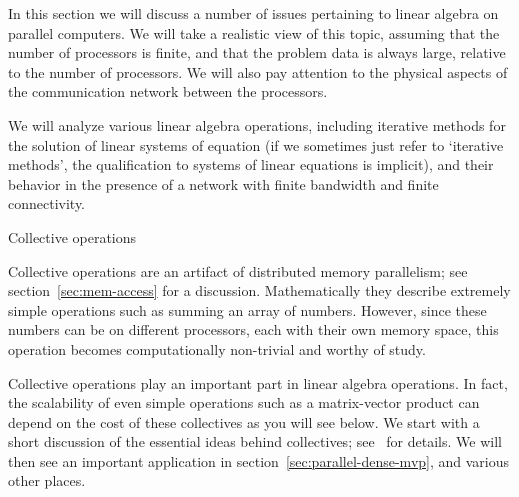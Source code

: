 
In this section we will discuss  a number of issues pertaining to
linear algebra on parallel computers. We will take a realistic view of
this topic, assuming that the number of processors is finite, and that
the problem data is always large, relative to the number of
processors. We will also pay attention to the physical aspects of the
communication network between the processors. 

We will analyze various linear algebra operations, including iterative
methods for the solution of linear systems of equation
(if we sometimes just refer to `iterative methods', the qualification
to systems of linear equations is implicit),
and their behavior in the presence of a network with finite
bandwidth and finite connectivity.

 {Collective operations}
\label{sec:collective}
\label{sec:collective-cost}

Collective operations are an artifact of distributed memory parallelism;
see section~\ref{sec:mem-access} for a discussion.
Mathematically they describe extremely simple operations
such as summing an array of numbers.
However, since these numbers can be on different processors,
each with their own memory space,
this operation becomes computationally non-trivial
and worthy of study.

Collective operations play an important part in linear algebra operations.
In fact, the scalability of even simple operations such as a matrix-vector product
can depend on the cost of these collectives as you will see below.
We start with a short discussion of the essential ideas behind collectives;
see~\cite{Chan2007Collective} for details.
We will then see an important application in section~\ref{sec:parallel-dense-mvp},
and various other places.


